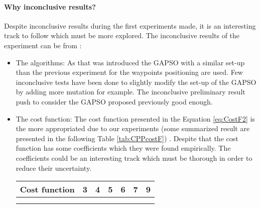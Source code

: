 	\paragraph*{Why inconclusive results?} \label{sec:inconclusiveResults}
			  
		
		Despite inconclusive results during the first experiments made, it is an interesting track to follow  which must  be more explored.  
		The inconclusive results of the experiment can be from : %
		\begin{itemize}
		\item The algorithms: As that was introduced the GAPSO  with a similar set-up than the previous experiment for the waypoints positioning %
		 are used. Few inconclusive tests have been done to slightly modify the set-up of the GAPSO by adding more mutation for example. The inconclusive preliminary result push to consider the GAPSO proposed previously good enough.
		\item The cost function: The cost function presented in the Equation \ref{eq:CostF2} is the more appropriated due to our experiments (some summarized result are presented in the following Table \ref{tab:CPPcostF}) . Despite that the cost function has some coefficients which they were found empirically. The coefficients could be an interesting track which must be thorough in order to reduce their uncertainty. 
		\begin{tabular}{l|p{1.3cm}p{1.3cm}p{1.3cm}p{1.3cm}p{1.3cm}p{1.3cm}}\label{tab:CPPcostF}
\textbf {Cost function} &\textbf {3}  &\textbf{4  }       & \textbf{5  } &\textbf{6  }&\textbf{7  }&\textbf{9  }\\ \hline
\cellcolor[HTML]{F2F2FF}{$\sum_{i=1}^{n}Pc_i + \frac{400\times\sum_{i=1}^{n}Pc_i}{(\frac{Distance}{N})\times 2.} /400$}  &  \cellcolor[HTML]{F2F2FF}{56.23\%  458px}       & \cellcolor[HTML]{F2F2FF}{ 60.54\%  652px} & \cellcolor[HTML]{F2F2FF}{65.15\%   817px}& \cellcolor[HTML]{F2F2FF}{ 65.85\%  1114px}& \cellcolor[HTML]{F2F2FF}{ 69.41\%  1077px}& \cellcolor[HTML]{F2F2FF}{ 90.67\%  1396px}\\ \hline
\cellcolor[HTML]{FFFFFF}{$\sum_{i=1}^{n}Pc_i + \frac{\sum_{i=1}^{n}Pc_i}{(\frac{Distance}{N})\times 5.}$}  &  \cellcolor[HTML]{FFFFFF}{56.15\%  444px}       & \cellcolor[HTML]{FFFFFF}{ 59.34\%  645px} & \cellcolor[HTML]{FFFFFF}{64.93\%  859px}& \cellcolor[HTML]{FFFFFF}{ 70.14\%  1051px}& \cellcolor[HTML]{FFFFFF}{ 76.59\%  1001px}& \cellcolor[HTML]{FFFFFF}{ 86.77\%  1381px}\\ \hline

\end{tabular}
\end{itemize}
